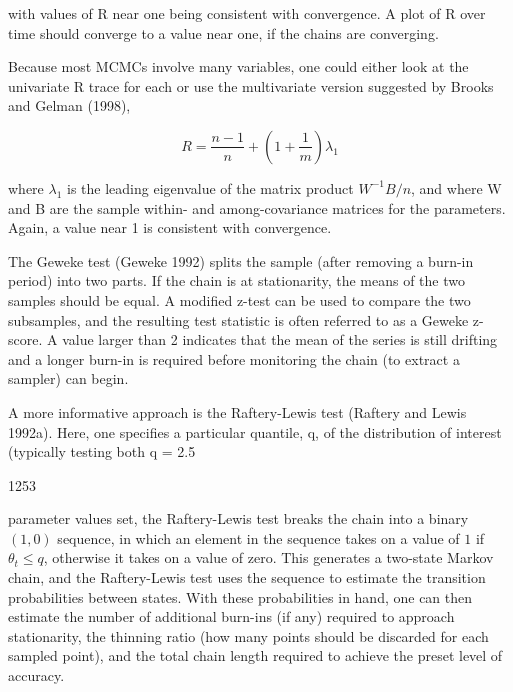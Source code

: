 \documentclass{article}
\begin{document}
with values of R near one being consistent with convergence. A plot of R over time should converge to a value near one, if the chains are converging.

Because most MCMCs involve many variables, one could either look at the univariate R trace for each or use the multivariate version suggested by Brooks and Gelman (1998),

\begin{equation}
R=\frac{n-1}{n}+\left(1+\frac{1}{m}\right)\lambda_{1}
\end{equation}

where  $ \lambda_1 $ is the leading eigenvalue of the matrix product  $ W^{-1}B/n $, and where W and B are the sample within- and among-covariance matrices for the parameters. Again, a value near 1 is consistent with convergence.

The Geweke test (Geweke 1992) splits the sample (after removing a burn-in period) into two parts. If the chain is at stationarity, the means of the two samples should be equal. A modified z-test can be used to compare the two subsamples, and the resulting test statistic is often referred to as a Geweke z-score. A value larger than 2 indicates that the mean of the series is still drifting and a longer burn-in is required before monitoring the chain (to extract a sampler) can begin.

A more informative approach is the Raftery-Lewis test (Raftery and Lewis 1992a). Here, one specifies a particular quantile, q, of the distribution of interest (typically testing both q = 2.5%

1253

parameter values set, the Raftery-Lewis test breaks the chain into a binary  $ (1, 0) $ sequence, in which an element in the sequence takes on a value of  $ 1 $ if  $ \theta_t \leq q $, otherwise it takes on a value of zero. This generates a two-state Markov chain, and the Raftery-Lewis test uses the sequence to estimate the transition probabilities between states. With these probabilities in hand, one can then estimate the number of additional burn-ins (if any) required to approach stationarity, the thinning ratio (how many points should be discarded for each sampled point), and the total chain length required to achieve the preset level of accuracy.
\end{document}
